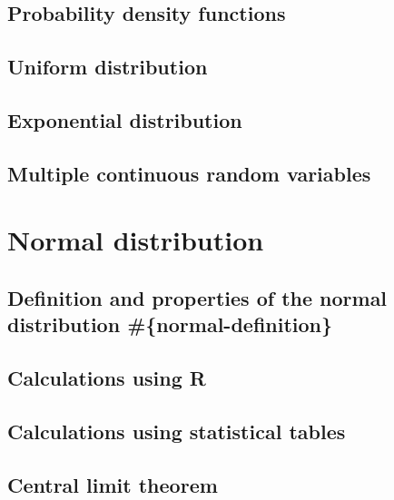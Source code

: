 \documentclass[
  a4paper,
]{book}
\theoremstyle{definition}
\theoremstyle{definition}
\theoremstyle{definition}
\theoremstyle{remark}
\begin{document}
\hypertarget{pdf}{%
\section{Probability density functions}\label{pdf}}

\hypertarget{uniform}{%
\section{Uniform distribution}\label{uniform}}

\hypertarget{exponential}{%
\section{Exponential distribution}\label{exponential}}

\hypertarget{continuous-multiple}{%
\section{Multiple continuous random variables}\label{continuous-multiple}}

\hypertarget{S09-normal}{%
\chapter{Normal distribution}\label{S09-normal}}

\hypertarget{definition-and-properties-of-the-normal-distribution-normal-definition}{%
\section{Definition and properties of the normal distribution \#\{normal-definition\}}\label{definition-and-properties-of-the-normal-distribution-normal-definition}}

\hypertarget{normal-r}{%
\section{Calculations using R}\label{normal-r}}

\hypertarget{normal-tables}{%
\section{Calculations using statistical tables}\label{normal-tables}}

\hypertarget{clt}{%
\section{Central limit theorem}\label{clt}}
\end{document}
